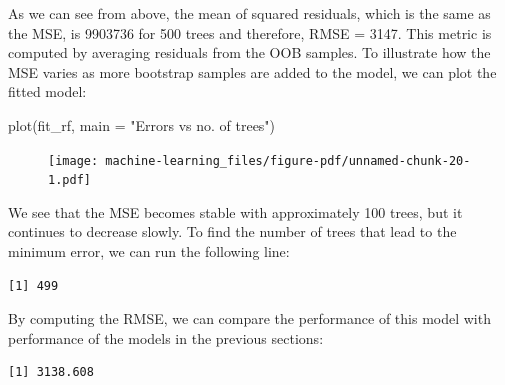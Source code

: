 \documentclass[
  letterpaper,
  DIV=11,
  numbers=noendperiod]{scrreprt}
\newenvironment{Shaded}{\begin{snugshade}}{\end{snugshade}}
\newcommand{\AttributeTok}[1]{\textcolor[rgb]{0.40,0.45,0.13}{#1}}
\newcommand{\FunctionTok}[1]{\textcolor[rgb]{0.28,0.35,0.67}{#1}}
\newcommand{\NormalTok}[1]{\textcolor[rgb]{0.00,0.23,0.31}{#1}}
\newcommand{\SpecialCharTok}[1]{\textcolor[rgb]{0.37,0.37,0.37}{#1}}
\newcommand{\StringTok}[1]{\textcolor[rgb]{0.13,0.47,0.30}{#1}}
\begin{document}
As we can see from above, the mean of squared residuals, which is the
same as the MSE, is 9903736 for 500 trees and therefore, RMSE = 3147.
This metric is computed by averaging residuals from the OOB samples. To
illustrate how the MSE varies as more bootstrap samples are added to the
model, we can plot the fitted model:

\begin{Shaded}
\begin{Highlighting}[]
\FunctionTok{plot}\NormalTok{(fit\_rf, }\AttributeTok{main =} \StringTok{"Errors vs no. of trees"}\NormalTok{)}
\end{Highlighting}
\end{Shaded}

\begin{figure}[H]

{\centering \texttt{[image: machine-learning\_files/figure-pdf/unnamed-chunk-20-1.pdf]}

}

\end{figure}

We see that the MSE becomes stable with approximately 100 trees, but it
continues to decrease slowly. To find the number of trees that lead to
the minimum error, we can run the following line:

\begin{Shaded}
\end{Shaded}

\begin{verbatim}
[1] 499
\end{verbatim}

By computing the RMSE, we can compare the performance of this model with
performance of the models in the previous sections:

\begin{Shaded}
\end{Shaded}

\begin{verbatim}
[1] 3138.608
\end{verbatim}
\end{document}
